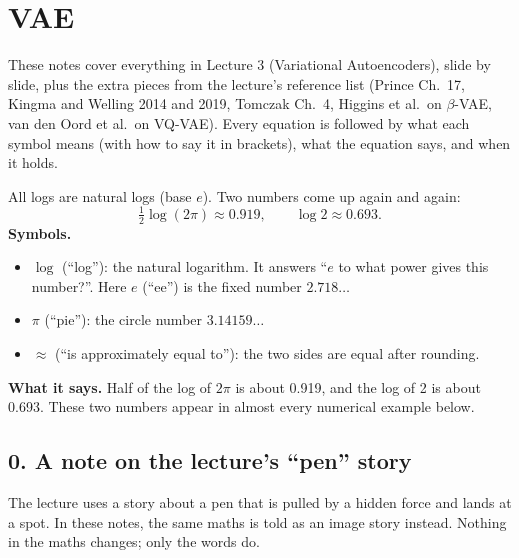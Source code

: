 \newpage

\section{VAE}

These notes cover everything in Lecture 3 (Variational Autoencoders), slide by slide, plus the extra pieces from the lecture's reference list (Prince Ch.~17, Kingma and Welling 2014 and 2019, Tomczak Ch.~4, Higgins et al.\ on $\beta$-VAE, van den Oord et al.\ on VQ-VAE). Every equation is followed by what each symbol means (with how to say it in brackets), what the equation says, and when it holds.

All logs are natural logs (base $e$). Two numbers come up again and again:
\[
\tfrac{1}{2}\log(2\pi) \approx 0.919, \qquad \log 2 \approx 0.693.
\]
\textbf{Symbols.}
\begin{itemize}[leftmargin=1.5em, itemsep=0pt]
\item $\log$ (``log''): the natural logarithm. It answers ``$e$ to what power gives this number?''. Here $e$ (``ee'') is the fixed number $2.718\ldots$
\item $\pi$ (``pie''): the circle number $3.14159\ldots$
\item $\approx$ (``is approximately equal to''): the two sides are equal after rounding.
\end{itemize}
\textbf{What it says.} Half of the log of $2\pi$ is about 0.919, and the log of 2 is about 0.693. These two numbers appear in almost every numerical example below.

\subsection*{0. A note on the lecture's ``pen'' story}

The lecture uses a story about a pen that is pulled by a hidden force and lands at a spot. In these notes, the same maths is told as an image story instead. Nothing in the maths changes; only the words do.

